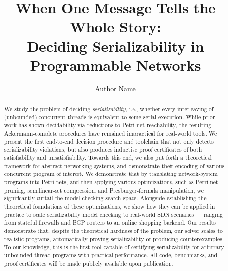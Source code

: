 \documentclass[acmsmall,review,anonymous,nonacm]{acmart}
\title{When One Message Tells the Whole Story:\\ Deciding Serializability in Programmable Networks}
\author{Author Name}
\affiliation{
  \institution{Institution Name}
  \city{City}
  \state{State}
  \country{Country}
}
\let\oldmaketitle\maketitle
\renewcommand{\maketitle}{
  \oldmaketitle
  \pagestyle{plain}  %
  \thispagestyle{plain}  %
}
\begin{document}
\begin{abstract}
	We study the problem of deciding \textit{serializability}, i.e., whether every interleaving of (unbounded) concurrent threads is equivalent to some serial execution. While prior work has shown decidability via reductions to Petri‐net reachability, the resulting Ackermann‐complete procedures have remained impractical for real‐world tools. We present the first end‐to‐end decision procedure and toolchain that not only detects serializability violations, but also produces inductive proof certificates of both satisfiability and unsatisfiability. Towards this end, we also put forth a theoretical framework for abstract networking systems, and demonstrate their encoding of various concurrent program of interest. 
	We demonstrate that by translating network‐system programs into Petri nets, and then applying various optimizations, such as Petri‐net pruning, semilinear‐set compression, and Presburger‐formula manipulation, we significantly curtail the model checking search space. 
	Alongside establishing the theoretical foundations of these optimizations, we show how they can be applied in practice to scale serializability model checking to real-world SDN scenarios --- ranging from stateful firewalls and BGP routers to an online shopping backend.
	Our results demonstrate that, despite the theoretical hardness of the problem, our solver scales to realistic programs, automatically proving serializability or producing counterexamples. To our knowledge, this is the first tool capable of certifying serializability for arbitrary unbounded‐thread programs with practical performance. All code, benchmarks, and proof certificates will be made publicly available upon publication.
\end{abstract}

%	

\maketitle












\newpage




\newpage







\end{document}
